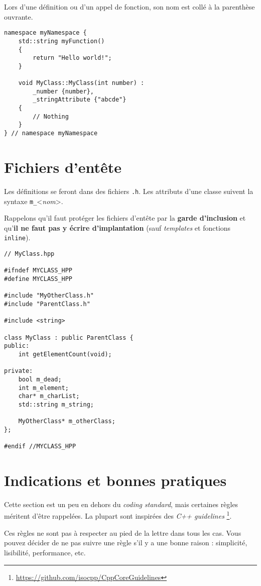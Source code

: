 \documentclass[12pt,a4paper]{article}
\newcommand{\flenglish}[1]{\emph{\foreignlanguage{english}{#1}}}
\begin{document}
Lors d'une définition ou d'un appel de fonction, son nom est collé à la parenthèse ouvrante.

\begin{lstlisting}
namespace myNamespace {
	std::string myFunction()
	{
		return "Hello world!";
	}
	
	void MyClass::MyClass(int number) :
		_number {number},
		_stringAttribute {"abcde"}
	{
		// Nothing
	}
} // namespace myNamespace
\end{lstlisting}

\section{Fichiers d'entête}
Les définitions se feront dans des fichiers \texttt{.h}. Les attributs d'une classe suivent la syntaxe \texttt{m\_}<\emph{nom}>.

\medskip
Rappelons qu'il faut protéger les fichiers d'entête par la \textbf{garde d'inclusion} et qu'\textbf{il ne faut pas y écrire d'implantation} (sauf \flenglish{templates} et fonctions \lstinline|inline|).
\begin{lstlisting}
// MyClass.hpp

#ifndef MYCLASS_HPP
#define MYCLASS_HPP

#include "MyOtherClass.h"
#include "ParentClass.h"

#include <string>

class MyClass : public ParentClass {
public:
	int getElementCount(void);

private:
	bool m_dead;
	int m_element;
	char* m_charList;
	std::string m_string;
	
	MyOtherClass* m_otherClass;
};

#endif //MYCLASS_HPP
\end{lstlisting}

\section{Indications et bonnes pratiques}
Cette section est un peu en dehors du \flenglish{coding standard}, mais certaines règles méritent d'être rappelées. La plupart sont inspirées des \flenglish{C++ guidelines} \footnote{\url{https://github.com/isocpp/CppCoreGuidelines}}.

Ces règles ne sont pas à respecter au pied de la lettre dans tous les cas. Vous pouvez décider de ne pas suivre une règle s'il y a une bonne raison : simplicité, lisibilité, performance, etc.
\end{document}
